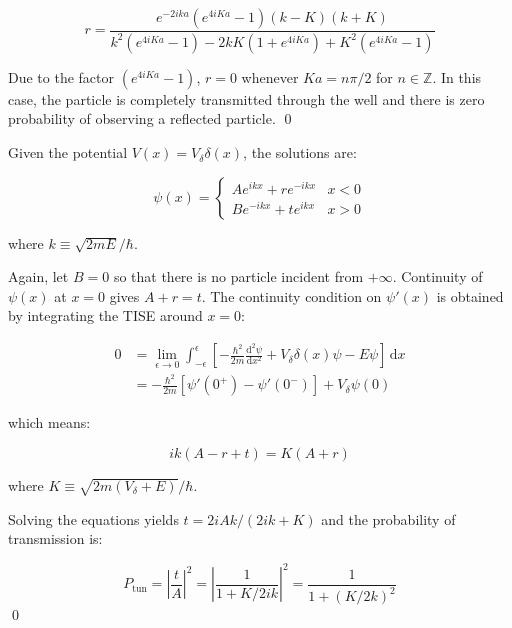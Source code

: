 \documentclass[12pt]{article}
\begin{document}
\begin{equation}
    r = \frac{e^{-2ika} \left( e^{4iKa} - 1 \right) (k - K) (k + K)}{k^{2} \left( e^{4iKa} - 1 \right) - 2kK \left( 1 + e^{4iKa} \right) + K^{2} \left( e^{4iKa} - 1 \right)}
\end{equation}

Due to the factor $(e^{4iKa} - 1)$, $r = 0$ whenever $Ka = n\pi/2$ for $n \in \mathbb{Z}$. In this case, the particle is completely transmitted through the well and there is zero probability of observing a reflected particle.
\qed


Given the potential $V(x) = V_{\delta} \delta(x)$, the solutions are:

\begin{equation}
    \psi(x) =
    \begin{cases}
        Ae^{ikx} + re^{-ikx} & x < 0 \\
        Be^{-ikx} + te^{ikx} & x > 0
    \end{cases}
\end{equation}

where $k \equiv \sqrt{2mE}/\hbar$.

Again, let $B = 0$ so that there is no particle incident from $+\infty$. Continuity of $\psi(x)$ at $x = 0$ gives $A + r = t$. The continuity condition on $\psi'(x)$ is obtained by integrating the TISE around $x = 0$:

\begin{equation}
    \begin{split}
        0 &= \lim_{\epsilon \to 0} \int_{-\epsilon}^{\epsilon} \left[ -\frac{\hbar^{2}}{2m} \frac{\mathrm{d}^{2} \psi}{\mathrm{d}x^{2}} + V_{\delta} \delta(x) \psi - E \psi \right] \, \mathrm{d}x \\
        &= -\frac{\hbar^{2}}{2m} \left[ \psi'(0^{+}) - \psi'(0^{-}) \right] + V_{\delta} \psi(0)
    \end{split}
\end{equation}

which means:

\begin{equation}
    ik(A - r + t) = K (A + r)
\end{equation}

where $K \equiv \sqrt{2m(V_{\delta} + E)}/\hbar$.

Solving the equations yields $t = 2iAk/(2ik + K)$ and the probability of transmission is:

\begin{equation}
    P_{\text{tun}} = \left\lvert \frac{t}{A} \right\rvert^{2} = \left\lvert \frac{1}{1 + K/2ik} \right\rvert^{2} = \frac{1}{1 + (K/2k)^{2}}
\end{equation}
\qed
\end{document}
